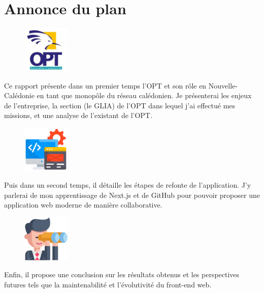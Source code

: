 \documentclass[12pt,a4paper]{report}
\begin{document}
\section{Annonce du plan}
\begin{figure}[h] %
    \centering
    \includegraphics[width=0.2\textwidth]{ressources_rapport/logo_opt.jpg}
\end{figure}
Ce rapport présente dans un premier temps l’OPT et son rôle en Nouvelle-Calédonie en tant que monopôle du réseau calédonien. Je présenterai les enjeux de l'entreprise, la section (le GLIA) de l'OPT dans lequel j'ai effectué mes missions, et une analyse de l'existant de l'OPT.

\vspace{1cm}
\begin{figure}[h] %
    \centering
    \includegraphics[width=0.2\textwidth]{ressources_rapport/app_web.png}
\end{figure}
Puis dans un second temps, il détaille les étapes de refonte de l’application. J'y parlerai de mon apprentissage de Next.js et de GitHub pour pouvoir proposer une application web moderne de manière collaborative.

\vspace{1cm}
\begin{figure}[h] %
    \centering
    \includegraphics[width=0.2\textwidth]{ressources_rapport/perspectives.png}
\end{figure}
Enfin, il propose une conclusion sur les résultats obtenus et les perspectives futures tels que la maintenabilité et l'évolutivité du front-end web.
\end{document}
